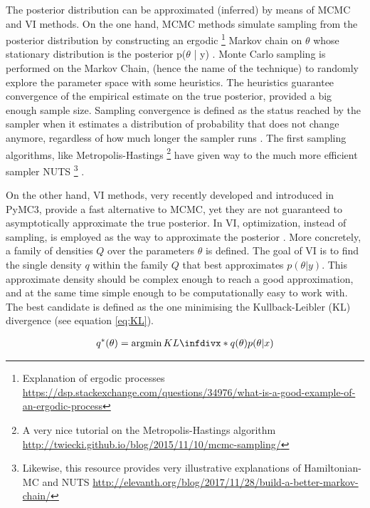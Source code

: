 The posterior distribution can be approximated (inferred) by means of \ac{MCMC} and \ac{VI} methods. On the one hand, \ac{MCMC} methods simulate sampling from the posterior distribution by constructing an ergodic \footnote{Explanation of ergodic processes \href{https://dsp.stackexchange.com/questions/34976/what-is-a-good-example-of-an-ergodic-process}{https://dsp.stackexchange.com/questions/34976/what-is-a-good-example-of-an-ergodic-process}} Markov chain on $\theta$ whose stationary distribution is the posterior p($\theta$ | y) \cite{Blei2017}. Monte Carlo sampling is performed on the Markov Chain, (hence the name of the technique) to randomly explore the parameter space with some heuristics. The heuristics guarantee convergence of the empirical estimate on the true posterior, provided a big enough sample size. Sampling convergence is defined as the status reached by the sampler when it estimates a distribution of probability that does not change anymore, regardless of how much longer the sampler runs \cite{Tran2018}. The first sampling algorithms, like Metropolis-Hastings \footnote{A very nice tutorial on the Metropolis-Hastings algorithm \href{http://twiecki.github.io/blog/2015/11/10/mcmc-sampling/}{http://twiecki.github.io/blog/2015/11/10/mcmc-sampling/}} \cite{Chib1995} have given way to the much more efficient sampler \ac{NUTS} \footnote{Likewise, this resource provides very illustrative explanations of Hamiltonian-MC and NUTS \href{http://elevanth.org/blog/2017/11/28/build-a-better-markov-chain/}{http://elevanth.org/blog/2017/11/28/build-a-better-markov-chain/}} \cite{Hoffman2011}.

On the other hand, \ac{VI} methods, very recently developed and introduced in PyMC3, provide a fast alternative to \ac{MCMC}, yet they are not guaranteed to asymptotically approximate the true posterior. In \ac{VI}, optimization, instead of sampling, is employed as the way to approximate the posterior \cite{Blei2017}. More concretely, a family of densities $Q$ over the parameters $\theta$ is defined. The goal of \ac{VI} is to find the single density $q$ within the family $Q$ that best approximates $p(\theta|y)$. This approximate density should be complex enough to reach a good approximation, and at the same time simple enough to be computationally easy to work with. The best candidate is defined as the one minimising the Kullback-Leibler (\ac{KL}) divergence (see equation \ref{eq:KL}).

\begin{gather}\label{eq:KL}
q^*(\theta) = \argmin \infdiv*{q(\theta)}{p(\theta|x)}
\end{gather}

